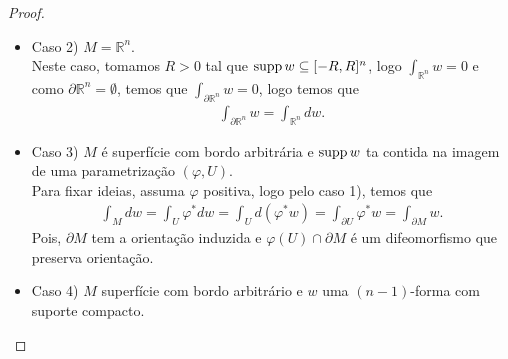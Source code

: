 \begin{proof}
\begin{itemize}
      Logo
      \begin{align*}
        \int_{\mathbb{H}^{n}}dw=&\sum_{i=1}^{n}(-1)^{i-1}\int_{0}^{R}\int_{-R}^{R}\cdots\int_{-R}^{R}\frac{\partial w_i}{\partial x_i}\,dx^{1}\cdots dx^{n}\\
        =&(-1)^{n-1}\int_{0}^{R}\int_{-R}^{R}\cdots\int_{-R}^{R}\frac{\partial w_n}{\partial x_n}\,dx^{1}\cdots dx^{n}\\
        =&(-1)^{n}\int_{-R}^{R}\cdots\int_{-R}^{R}w_n(x^1,\cdots,x^{n-1},0)\,dx^{1}\cdots dx^{n-1}.
      \end{align*}
      Agora, como o bordo $\partial\mathbb{H}^{n}=\mathbb{R}^{n-1}\times\{0\}$ com coordenadas $(x^{1},\cdots,x^{n-1})$, temos que a inclusão $i:\partial\mathbb{H}^{n}\to\mathbb{H}^{n}$ satisfaz $i^{\ast}(dx^{i})=dx^{i}$ para todo $i<n$ e $i^{\ast}(dx^{n})=0$.\\
      Logo, como vimos na proposição \ref{prop:difeomorfismo-superficies} a orientação inuzida $\partial\mathbb{H}^{n}$ é dada por
      \begin{align*}
        \int_{\partial\mathbb{H}^{n}}w=(-1)^n\int_{\mathbb{H}^{n}}w_n(x^{1},\cdots,x^{n-1},0)dx^{1}\cdots dx^{n-1}=\int_{\mathbb{H}^{n}}dw.
      \end{align*}
    \item Caso 2) $M=\mathbb{R}^{n}$.\\
      Neste caso, tomamos $R>0$ tal que $\operatorname{supp} w\subseteq [-R,R]^{n}$, logo $\int_{\mathbb{R}^{n}}w=0$ e como $\partial\mathbb{R}^{n}=\emptyset$, temos que $\int_{\partial\mathbb{R}^{n}}w=0$, logo temos que
      \begin{align*}
        \int_{\partial\mathbb{R}^{n}}w=\int_{\mathbb{R}^{n}}dw.
      \end{align*}
    \item Caso 3) $M$ é superfície com bordo arbitrária e $\operatorname{supp} w$ ta contida na imagem de uma parametrização $(\varphi,U)$.\\
      Para fixar ideias, assuma $\varphi$ positiva, logo pelo caso 1), temos que
      \begin{align*}
        \int_{M}dw=\int_{U}\varphi^{\ast}dw=\int_{U}d\left( \varphi^{\ast}w \right)=\int_{\partial U}\varphi^{\ast}w=\int_{\partial M}w.
      \end{align*}
      Pois, $\partial M$ tem a orientação induzida e $\varphi(U)\cap \partial M$ é um difeomorfismo que preserva orientação.
    \item Caso 4) $M$ superfície com bordo arbitrário e $w$ uma $(n-1)$-forma com suporte compacto.\\

\end{itemize}
\end{proof}
